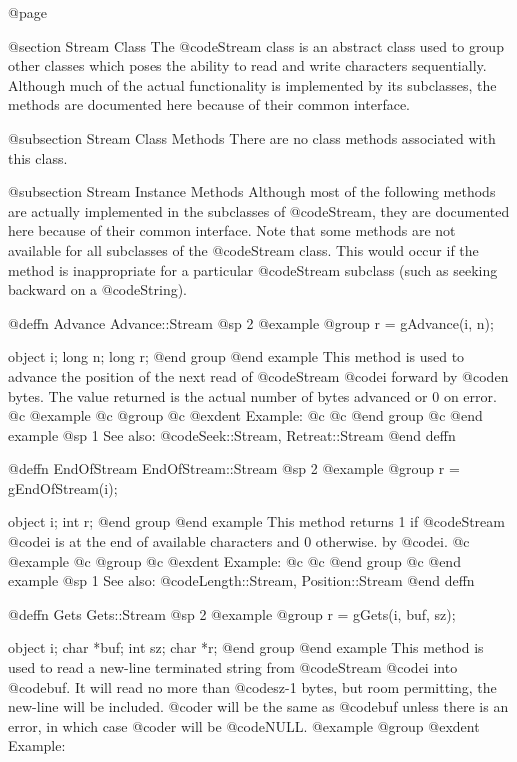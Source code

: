 @page

@section Stream Class
The @code{Stream} class is an abstract class used to group other classes
which poses the ability to read and write characters sequentially.
Although much of the actual functionality is implemented by its
subclasses, the methods are documented here because of their common
interface.

@subsection Stream Class Methods
There are no class methods associated with this class.


@subsection Stream Instance Methods
Although most of the following methods are actually implemented in the
subclasses of @code{Stream}, they are documented here because of their
common interface.  Note that some methods are not available for all
subclasses of the @code{Stream} class.  This would occur if the method
is inappropriate for a particular @code{Stream} subclass (such as
seeking backward on a @code{String}).





@deffn {Advance} Advance::Stream
@sp 2
@example
@group
r = gAdvance(i, n);

object  i;
long    n;
long    r;
@end group
@end example
This method is used to advance the position of the next
read of @code{Stream} @code{i} forward by @code{n} bytes.
The value returned is the actual number of bytes advanced or
0 on error.
@c @example
@c @group
@c @exdent Example:
@c  
@c @end group
@c @end example
@sp 1
See also:  @code{Seek::Stream, Retreat::Stream}
@end deffn








@deffn {EndOfStream} EndOfStream::Stream
@sp 2
@example
@group
r = gEndOfStream(i);

object  i;
int     r;
@end group
@end example
This method returns 1 if @code{Stream} @code{i} is at the end of available
characters and 0 otherwise.
by @code{i}.
@c @example
@c @group
@c @exdent Example:
@c  
@c @end group
@c @end example
@sp 1
See also:  @code{Length::Stream, Position::Stream}
@end deffn








@deffn {Gets} Gets::Stream
@sp 2
@example
@group
r = gGets(i, buf, sz);

object  i;
char    *buf;
int     sz;
char    *r;
@end group
@end example
This method is used to read a new-line terminated string from
@code{Stream} @code{i} into @code{buf}.  It will read no more than
@code{sz-1} bytes, but room permitting, the new-line will be included.
@code{r} will be the same as @code{buf} unless there is an error, in
which case @code{r} will be @code{NULL}.
@example
@group
@exdent Example:
  
